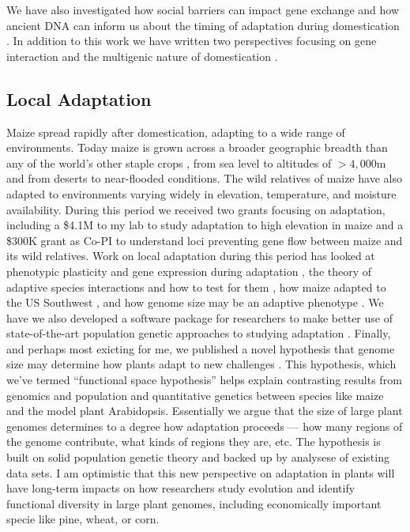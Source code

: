 \documentclass[letterpaper,10pt]{article}
\begin{document}
We have also investigated how social barriers can impact gene exchange \cite{orozco2016maize} and how ancient DNA can inform us about the timing of adaptation during domestication \cite{ramos2016genome}.
In addition to this work we have written two perspectives focusing on gene interaction \cite{Stitzer2018} and the multigenic nature of domestication \cite{stetter2018genetic}.

\subsection*{Local Adaptation}
Maize spread rapidly after domestication, adapting to a wide range of environments.
Today maize is grown across a broader geographic breadth than any of the world's other staple crops \cite{hake2015genetic}, from sea level to altitudes of $>4,000$m and from deserts to near-flooded conditions.
The wild relatives of maize have also adapted to environments varying widely in elevation, temperature, and moisture availability.
During this period we received two grants focusing on adaptation, including a \$4.1M to my lab to study adaptation to high elevation in maize and a \$300K grant as Co-PI to understand loci preventing gene flow between maize and its wild relatives.
Work on local adaptation during this period has looked at phenotypic plasticity \cite{lorant2017potential} and gene expression during adaptation \cite{aguilar2017allele}, the theory of adaptive species interactions and how to test for them \cite{o2015evolutionary}, how maize adapted to the US Southwest \cite{swarts2017genomic}, and how genome size may be an adaptive phenotype \cite{bilinski2018parallel}.
We have we also developed a software package for researchers to make better use of state-of-the-art population genetic approaches to studying adaptation \cite{durvasula2016angsd}.
Finally, and perhaps most exicting for me, we published a novel hypothesis that genome size may determine how plants adapt to new challenges \cite{mei2018adaptation}.
This hypothesis, which we've termed ``functional space hypothesis'' helps explain contrasting results from genomics and population and quantitative genetics between species like maize and the model plant Arabidopsis.
Essentially we argue that the size of large plant genomes determines to a degree how adaptation proceeds --- how many regions of the genome contribute, what kinds of regions they are, etc.
The hypothesis is built on solid population genetic theory and backed up by analysese of existing data sets.
I am optimistic that this new perspective on adaptation in plants will have long-term impacts on how researchers study evolution and identify functional diversity in large plant genomes, including economically important specie like pine, wheat, or corn.
\end{document}
